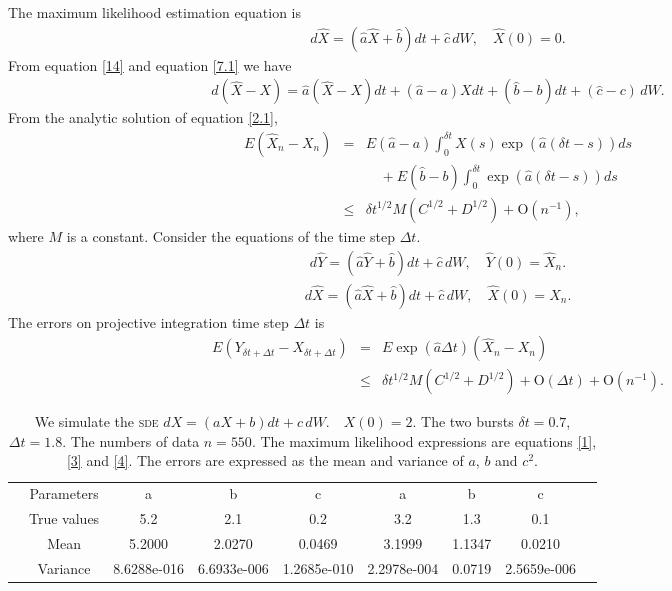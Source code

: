\documentclass[12pt,reqno, a4paper]{article}
\numberwithin{equation}{section}
\begin{document}
The maximum likelihood estimation equation is
\begin{eqnarray} \label{7.1}
d\hat{X}=(\hat{a}\hat{X}+\hat{b})dt+\hat{c}\,dW,   \quad  \hat {X}(0)=0.
\end{eqnarray}
 From equation \eqref{14} and equation \eqref{7.1} we have
 \begin{eqnarray}\label{2.1}
d(\hat {X}-X)=\hat {a}(\hat {X}-X)dt+(\hat{a}-a)X dt+(\hat {b}-b) dt+{(\hat{c}-c)}\,dW.
\end{eqnarray}
From the analytic solution of equation \eqref{2.1},
\begin{eqnarray*}E(\hat {X}_n-X_n)&=& E(\hat{a}-a)\int_0^{\delta t}X(s)\exp(\hat{a}(\delta t-s))ds\\&&\quad{} +E(\hat{b}-b)\int_0^{\delta t}\exp(\hat{a}(\delta t-s))ds\\& \leq & \delta t^{1/2}M (C^{1/2}+D^{1/2})+\mathrm{O}(n^{-1}),\end{eqnarray*}
where $M$ is a constant.
Consider the equations of the time step $\Delta t$.
\begin{eqnarray} \label{7.2}
d\hat{Y}=(\hat{a}\hat{Y}+\hat{b})dt+\hat{c}\,dW,   \quad  \hat {Y}(0)=\hat {X}_n.
\end{eqnarray}
\begin{eqnarray} \label{7.}
d\hat{X}=(\hat{a}\hat{X}+\hat{b})dt+\hat{c}\,dW,   \quad  \hat {X}(0)=X_n.
\end{eqnarray}
The errors on projective integration time step $\Delta t$ is
\begin{eqnarray*}E(Y_{\delta t+\Delta t}-X_{\delta t+\Delta t})&=&E\exp(\hat{a}\Delta t)(\hat {X}_n-X_n)\\&\leq&  \delta t^{1/2}M (C^{1/2}+D^{1/2})+\mathrm{O}{(\Delta t)}+\mathrm{O}(n^{-1}).\end{eqnarray*}
\begin{table}[htbp]
  \caption{\label{tab1} We simulate the \textsc{sde}
$
dX=(aX+b)dt+c\,dW. \quad  X(0)=2.
$  The two bursts  $\delta t=0.7$, $\Delta t=1.8$. The numbers of data $n=550$. The maximum likelihood expressions are equations \eqref{1}, \eqref{3}  and \eqref{4}. The errors are expressed as the mean  and variance of  $a$, $b$ and $c^2$. }
 \begin{tabular}{ccccccccc}
  \toprule
  &Parameters & a & b &  c & a& b & c\\
  &  True values  &5.2& 2.1 &0.2 & 3.2&1.3 &0.1 \\
  \midrule
&Mean& 5.2000 &  2.0270&  0.0469& 3.1999&  1.1347&  0.0210 \\
& Variance & 8.6288e-016& 6.6933e-006 & 1.2685e-010 & 2.2978e-004 & 0.0719&  2.5659e-006\\
  \bottomrule
 \end{tabular}

\end{table}
\end{document}
